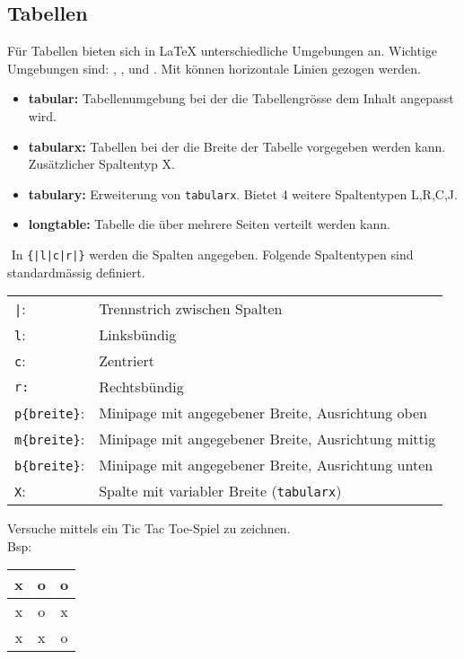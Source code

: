 \subsection{Tabellen}
Für Tabellen bieten sich in \LaTeX{} unterschiedliche Umgebungen an. Wichtige Umgebungen sind: , ,  und . Mit  können horizontale Linien gezogen werden.
\begin{itemize}
	\item \textbf{tabular:} Tabellenumgebung bei der die Tabellengrösse dem Inhalt angepasst wird. 
	\item \textbf{tabularx:} Tabellen bei der die Breite der Tabelle vorgegeben werden kann. Zusätzlicher Spaltentyp X.
	\item \textbf{tabulary:} Erweiterung von \texttt{tabularx}. Bietet 4 weitere Spaltentypen L,R,C,J.
	\item \textbf{longtable:} Tabelle die über mehrere Seiten verteilt werden kann.
\end{itemize}
$ $\vspace{-12pt}
In \texttt{\{|l|c|r|\}} werden die Spalten angegeben. Folgende Spaltentypen sind standardmässig definiert.\\ 
\begin{tabular}{l l}
	\texttt{|}: & Trennstrich zwischen Spalten\\
 	\texttt{l}: & Linksbündig \\
	\texttt{c}: & Zentriert\\
	\texttt{r:} & Rechtsbündig\\
	\texttt{p\{breite\}}: & Minipage mit angegebener Breite, Ausrichtung oben\\
	\texttt{m\{breite\}}: & Minipage mit angegebener Breite, Ausrichtung mittig\\
	\texttt{b\{breite\}}: & Minipage mit angegebener Breite, Ausrichtung unten\\
	\texttt{X}: & Spalte mit variabler Breite (\texttt{tabularx})\\
\end{tabular}\clearpage
\begin{aufgabe}
  Versuche mittels  ein Tic Tac Toe-Spiel zu zeichnen.\\
  Bsp:
  \begin{tabular}{c|c|c}
  	x & o & o\\ \hline
  	x & o & x\\ \hline
  	x & x & o\\
  \end{tabular}
  
\end{aufgabe}

